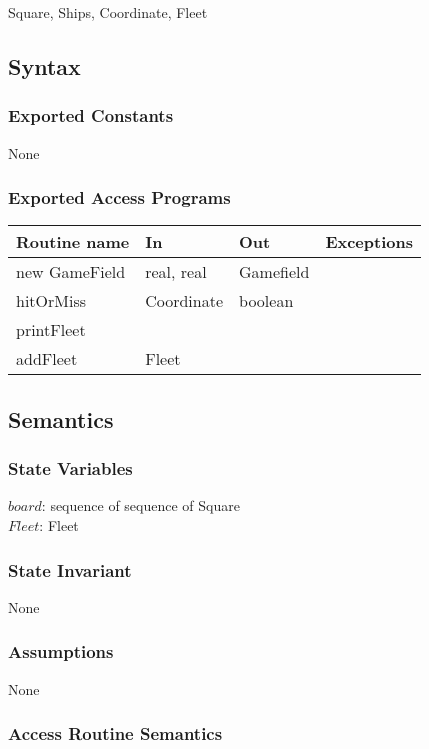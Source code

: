 \documentclass[12pt,fleqn]{article}
\begin{document}
    Square, Ships, Coordinate, Fleet

    \subsection* {Syntax}

    \subsubsection* {Exported Constants}
    None

    \subsubsection* {Exported Access Programs}

    \begin{tabular}{| l | l | l | l |}
    \hline
    \textbf{Routine name} & \textbf{In} & \textbf{Out} & \textbf{Exceptions}\\
    \hline
    new GameField & real, real & Gamefield & ~\\
    \hline
    hitOrMiss & Coordinate & boolean & ~\\
    \hline
    printFleet & ~ &  & ~\\
    \hline
    addFleet & Fleet & ~ & ~\\
    \hline

    \end{tabular}

    \subsection* {Semantics}

    \subsubsection* {State Variables}
    $board$: sequence of sequence of Square\\
    $Fleet$: Fleet

    \subsubsection* {State Invariant}
    None

    \subsubsection* {Assumptions}
    None

    \subsubsection* {Access Routine Semantics}
\end{document}
